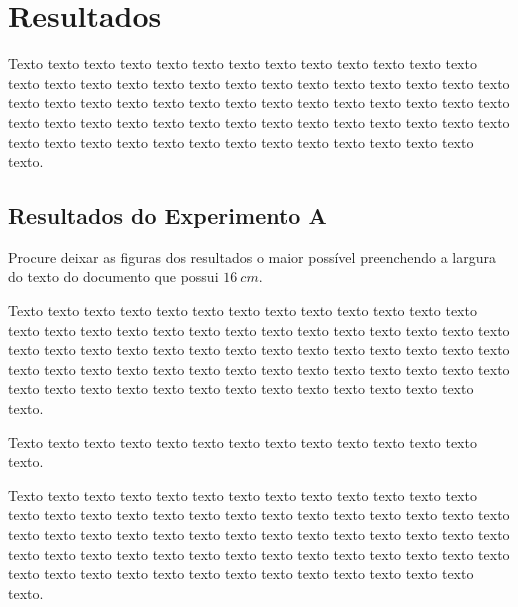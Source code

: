 \chapter{Resultados}
\label{chap:resultados}

Texto texto texto texto texto texto texto texto texto texto texto texto texto texto texto texto texto texto texto texto texto texto texto texto texto texto texto texto texto texto texto texto texto texto texto texto texto texto texto texto texto texto texto texto texto texto texto texto texto texto texto texto texto texto texto texto texto texto texto texto texto texto texto texto texto texto texto texto texto.

\section{Resultados do Experimento A}
\label{sec:resultados-do-experimento-a}

Procure deixar as figuras dos resultados o maior possível preenchendo a largura do texto do documento que possui $16~cm$.

\begin{figure}[h!]
        \captionsetup{width=16cm}
\end{figure}

Texto texto texto texto texto texto texto texto texto texto texto texto texto texto texto texto texto texto texto texto texto texto texto texto texto texto texto texto texto texto texto texto texto texto texto texto texto texto texto texto texto texto texto texto texto texto texto texto texto texto texto texto texto texto texto texto texto texto texto texto texto texto texto texto texto texto texto texto texto.

\begin{figure}[h!]
	\captionsetup{width=16cm}
\end{figure}

Texto texto texto texto texto texto texto texto texto texto texto texto texto texto.

Texto texto texto texto texto texto texto texto texto texto texto texto texto texto texto texto texto texto texto texto texto texto texto texto texto texto texto texto texto texto texto texto texto texto texto texto texto texto texto texto texto texto texto texto texto texto texto texto texto texto texto texto texto texto texto texto texto texto texto texto texto texto texto texto texto texto texto texto texto.

